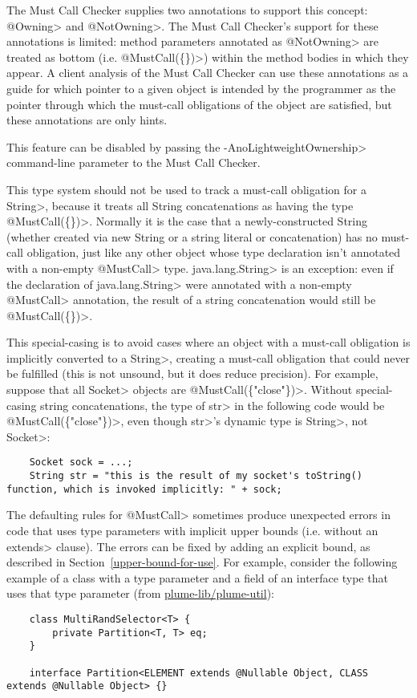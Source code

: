 The Must Call Checker supplies two annotations to support this concept: \<@Owning> and \<@NotOwning>.
The Must Call Checker's support for these annotations is limited: method parameters annotated as
\<@NotOwning> are treated as bottom (i.e. \<@MustCall(\{\})>) within the method bodies in which they
appear. A client analysis of the Must Call Checker can use these annotations as a guide for which
pointer to a given object is intended by the programmer as the pointer through which the must-call obligations
of the object are satisfied, but these annotations are only hints.

This feature can be disabled by passing the \<-AnoLightweightOwnership> command-line parameter to the Must
Call Checker.


This type system should not be used to track a must-call obligation for a \<String>, because it treats all
String concatenations as having the type \<@MustCall(\{\})>.
Normally it is the case that a newly-constructed String (whether created via new String or a string literal
or concatenation) has no must-call obligation, just like any other object whose type declaration isn't annotated with a
non-empty \<@MustCall> type. \<java.lang.String> is an exception: even if the declaration of \<java.lang.String> were
annotated with a non-empty \<@MustCall> annotation, the result of a string concatenation would still be \<@MustCall(\{\})>.

This special-casing is to avoid cases where
an object with a must-call obligation is implicitly converted to a \<String>, creating a must-call obligation
that could never be fulfilled (this is not unsound, but it does reduce precision). For example, suppose that
all \<Socket> objects are \<@MustCall(\{"close"\})>. Without special-casing string concatenations, the type of
\<str> in the following code would be \<@MustCall(\{"close"\})>, even though \<str>'s dynamic type is \<String>, not
\<Socket>:
\begin{Verbatim}
    Socket sock = ...;
    String str = "this is the result of my socket's toString() function, which is invoked implicitly: " + sock;
\end{Verbatim}


The defaulting rules for \<@MustCall> sometimes produce unexpected errors in code
that uses type parameters with implicit upper bounds (i.e. without an \<extends> clause).
The errors can be fixed by adding an explicit bound, as described in Section~\ref{upper-bound-for-use}.
For example, consider the following
example of a class with a type parameter and a field of an interface type that uses that
type parameter (from \href{https://github.com/plume-lib/plume-util}{plume-lib/plume-util}):
\begin{Verbatim}
    class MultiRandSelector<T> {
        private Partition<T, T> eq;
    }

    interface Partition<ELEMENT extends @Nullable Object, CLASS extends @Nullable Object> {}
\end{Verbatim}

